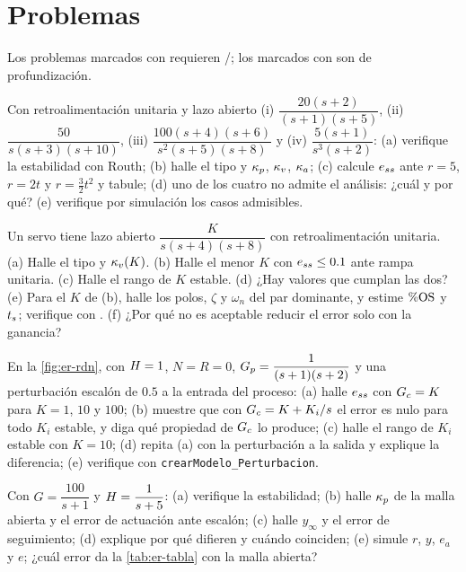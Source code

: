 \section{Problemas}
\label{sec:er-problemas}

Los problemas marcados con \etiquetaM{} requieren \matlab/\simulink; los marcados con \etiquetaEstrella{} son de profundización.

\begin{problema}\label{prob:er-tipos}
Con retroalimentación unitaria y lazo abierto (i) $\dfrac{20(s+2)}{(s+1)(s+5)}$, (ii) $\dfrac{50}{s(s+3)(s+10)}$, (iii) $\dfrac{100(s+4)(s+6)}{s^2(s+5)(s+8)}$ y (iv) $\dfrac{5(s+1)}{s^3(s+2)}$: (a) verifique la estabilidad con Routh; (b) halle el tipo y $\kappa_p$, $\kappa_v$, $\kappa_a$; (c) calcule $e_{ss}$ ante $r=5$, $r=2t$ y $r=\frac32t^2$ y tabule; (d) uno de los cuatro no admite el análisis: ¿cuál y por qué? (e) \etiquetaM{} verifique por simulación los casos admisibles.
\end{problema}

\begin{problema}\label{prob:er-posicion}
Un servo tiene lazo abierto $\dfrac{K}{s(s+4)(s+8)}$ con retroalimentación unitaria. (a) Halle el tipo y $\kappa_v(K)$. (b) Halle el menor $K$ con $e_{ss}\le0.1$ ante rampa unitaria. (c) Halle el rango de $K$ estable. (d) ¿Hay valores que cumplan las dos? (e) Para el $K$ de (b), halle los polos, $\zeta$ y $\omega_n$ del par dominante, y estime $\%\mathrm{OS}$ y $t_s$; \etiquetaM{} verifique con . (f) ¿Por qué no es aceptable reducir el error solo con la ganancia?
\end{problema}

\begin{problema}[perturbaciones]\label{prob:er-perturbacion}
En la \cref{fig:er-rdn}, con $H=1$, $N=R=0$, $G_p=\dfrac{1}{(s+1)(s+2)}$ y una perturbación escalón de $0.5$ a la entrada del proceso: (a) halle $e_{ss}$ con $G_c=K$ para $K=1$, $10$ y $100$; (b) muestre que con $G_c=K+K_i/s$ el error es nulo para todo $K_i$ estable, y diga qué propiedad de $G_c$ lo produce; (c) halle el rango de $K_i$ estable con $K=10$; (d) repita (a) con la perturbación a la salida y explique la diferencia; (e) \etiquetaM{} verifique con \texttt{crearModelo\_Perturbacion}.
\end{problema}

\begin{problema}\label{prob:er-gh}
Con $G=\dfrac{100}{s+1}$ y $H=\dfrac{1}{s+5}$: (a) verifique la estabilidad; (b) halle $\kappa_p$ de la malla abierta y el error de actuación ante escalón; (c) halle $y_\infty$ y el error de seguimiento; (d) explique por qué difieren y cuándo coinciden; (e) \etiquetaM{} simule $r$, $y$, $e_a$ y $e$; ¿cuál error da la \cref{tab:er-tabla} con la malla abierta?
\end{problema}

